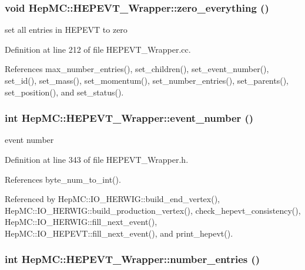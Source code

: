 \subsubsection{\setlength{\rightskip}{0pt plus 5cm}void Hep\-MC::HEPEVT\_\-Wrapper::zero\_\-everything ()\hspace{0.3cm}{\tt  [static]}}\label{classHepMC_1_1HEPEVT__Wrapper_669593cd5af0e20520962a5f419ebf52}


set all entries in HEPEVT to zero 



Definition at line 212 of file HEPEVT\_\-Wrapper.cc.

References max\_\-number\_\-entries(), set\_\-children(), set\_\-event\_\-number(), set\_\-id(), set\_\-mass(), set\_\-momentum(), set\_\-number\_\-entries(), set\_\-parents(), set\_\-position(), and set\_\-status().
\subsubsection{\setlength{\rightskip}{0pt plus 5cm}int Hep\-MC::HEPEVT\_\-Wrapper::event\_\-number ()\hspace{0.3cm}{\tt  [inline, static]}}\label{classHepMC_1_1HEPEVT__Wrapper_75fe312f2cfb59db1b8dd7796be78dea}


event number 



Definition at line 343 of file HEPEVT\_\-Wrapper.h.

References byte\_\-num\_\-to\_\-int().

Referenced by Hep\-MC::IO\_\-HERWIG::build\_\-end\_\-vertex(), Hep\-MC::IO\_\-HERWIG::build\_\-production\_\-vertex(), check\_\-hepevt\_\-consistency(), Hep\-MC::IO\_\-HERWIG::fill\_\-next\_\-event(), Hep\-MC::IO\_\-HEPEVT::fill\_\-next\_\-event(), and print\_\-hepevt().
\subsubsection{\setlength{\rightskip}{0pt plus 5cm}int Hep\-MC::HEPEVT\_\-Wrapper::number\_\-entries ()\hspace{0.3cm}{\tt  [inline, static]}}\label{classHepMC_1_1HEPEVT__Wrapper_69b67d3c95321dc6130996e086480e86}


